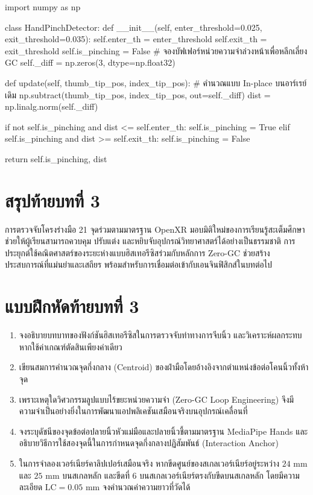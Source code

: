\begin{codebox}
import numpy as np

class HandPinchDetector:
    def __init__(self, enter_threshold=0.025, exit_threshold=0.035):
        self.enter_th = enter_threshold
        self.exit_th = exit_threshold
        self.is_pinching = False
        # จองบัฟเฟอร์หน่วยความจำล่วงหน้าเพื่อหลีกเลี่ยง GC
        self._diff = np.zeros(3, dtype=np.float32)

    def update(self, thumb_tip_pos, index_tip_pos):
        # คำนวณแบบ In-place บนอาร์เรย์เดิม
        np.subtract(thumb_tip_pos, index_tip_pos, out=self._diff)
        dist = np.linalg.norm(self._diff)

        if not self.is_pinching and dist <= self.enter_th:
            self.is_pinching = True
        elif self.is_pinching and dist >= self.exit_th:
            self.is_pinching = False

        return self.is_pinching, dist
\end{codebox}

\clearpage

\section*{สรุปท้ายบทที่ 3}

การตรวจจับโครงร่างมือ 21 จุดร่วมตามมาตรฐาน OpenXR มอบมิติใหม่ของการเรียนรู้สะเต็มศึกษา ช่วยให้ผู้เรียนสามารถควบคุม ปรับแต่ง และหยิบจับอุปกรณ์วิทยาศาสตร์ได้อย่างเป็นธรรมชาติ การประยุกต์ใช้คณิตศาสตร์ของระยะห่างแบบฮิสเทอรีซิสร่วมกับหลักการ Zero-GC ช่วยสร้างประสบการณ์ที่แม่นยำและเสถียร พร้อมสำหรับการเชื่อมต่อเข้ากับเอนจินฟิสิกส์ในบทต่อไป

\clearpage

\section*{แบบฝึกหัดท้ายบทที่ 3}

\begin{enumerate}
    \item จงอธิบายบทบาทของฟังก์ชันฮิสเทอรีซิสในการตรวจจับท่าทางการจีบนิ้ว และวิเคราะห์ผลกระทบหากใช้ค่าเกณฑ์ตัดสินเพียงค่าเดียว
    \item เขียนสมการคำนวณจุดกึ่งกลาง (Centroid) ของฝ่ามือโดยอ้างอิงจากตำแหน่งข้อต่อโคนนิ้วทั้งห้าจุด
    \item เพราะเหตุใดวิศวกรรมลูปแบบไร้ขยะหน่วยความจำ (Zero-GC Loop Engineering) จึงมีความจำเป็นอย่างยิ่งในการพัฒนาแอปพลิเคชันเสมือนจริงบนอุปกรณ์เคลื่อนที่
    \item จงระบุดัชนีของจุดข้อต่อปลายนิ้วหัวแม่มือและปลายนิ้วชี้ตามมาตรฐาน MediaPipe Hands และอธิบายวิธีการใช้สองจุดนี้ในการกำหนดจุดกึ่งกลางปฏิสัมพันธ์ (Interaction Anchor)
    \item ในการจำลองเวอร์เนียร์คาลิปเปอร์เสมือนจริง หากขีดศูนย์ของสเกลเวอร์เนียร์อยู่ระหว่าง $24\text{ mm}$ และ $25\text{ mm}$ บนสเกลหลัก และขีดที่ 6 บนสเกลเวอร์เนียร์ตรงกับขีดบนสเกลหลัก โดยมีความละเอียด $\text{LC} = 0.05\text{ mm}$ จงคำนวณค่าความยาวที่วัดได้
\end{enumerate}
